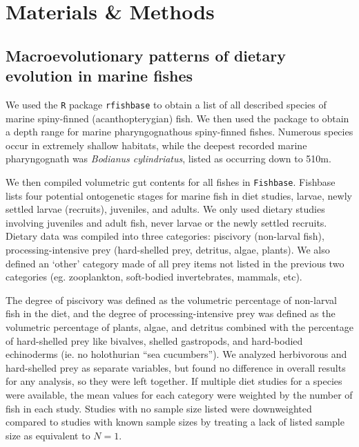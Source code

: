 \section{Materials \& Methods}

\subsection{Macroevolutionary patterns of dietary evolution in marine fishes}

We used the {\tt R} package {\tt rfishbase} \cite{boettiger2012rfishbase} to obtain a list of all described species of marine spiny-finned (acanthopterygian) fish. We then used the package to obtain a depth range for marine pharyngognathous spiny-finned fishes. Numerous species occur in extremely shallow habitats, while the deepest recorded marine pharyngognath was {\em Bodianus cylindriatus}, listed as occurring down to 510m.

We then compiled volumetric gut contents for all fishes in {\tt Fishbase}. \cite{froese2013fishbase} Fishbase lists four potential ontogenetic stages for marine fish in diet studies, larvae, newly settled larvae (recruits), juveniles, and adults. We only used dietary studies involving juveniles and adult fish, never larvae or the newly settled recruits. Dietary data was compiled into three categories: piscivory (non-larval fish), processing-intensive prey (hard-shelled prey, detritus, algae, plants). We also defined an `other' category made of all prey items not listed in the previous two categories (eg. zooplankton, soft-bodied invertebrates, mammals, etc). 

The degree of piscivory was defined as the volumetric percentage of non-larval fish in the diet, and the degree of processing-intensive prey was defined as the volumetric percentage of plants, algae, and detritus combined with the percentage of hard-shelled prey like bivalves, shelled gastropods, and hard-bodied echinoderms (ie. no holothurian ``sea cucumbers''). We analyzed herbivorous and hard-shelled prey as separate variables, but found no difference in overall results for any analysis, so they were left together. If multiple diet studies for a species were available, the mean values for each category were weighted by the number of fish in each study. Studies with no sample size listed were downweighted compared to studies with known sample sizes by treating a lack of listed sample size as equivalent to $N=1$.

